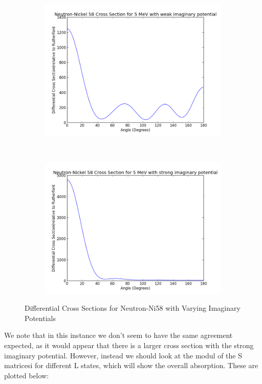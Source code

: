 \documentclass[paper=a4, fontsize=11pt]{scrartcl} %
\numberwithin{equation}{section} %
\numberwithin{figure}{section} %
\numberwithin{table}{section} %
\begin{document}
 \begin{figure}[hbt!]
        \centering
        \begin{subfigure}[b!]{0.35\textwidth}
                \includegraphics[width=\textwidth]{NeutronWeakcs.png}
        \end{subfigure}%
        ~ %
\quad
        \begin{subfigure}[b!]{0.35\textwidth}
                \includegraphics[width=\textwidth]{NeutronStrongcs.png}
        \end{subfigure}

        \caption{Differential Cross Sections for Neutron-Ni58 with Varying Imaginary Potentials}
\end{figure}
We note that in this instance we don't seem to have the same agreement expected, as it would appear that there is a larger cross section with the strong imaginary potential. However, instead we should look at the modul of the S matricesi for different L states, which will show the overall absorption. These are plotted below:\\
\end{document}
